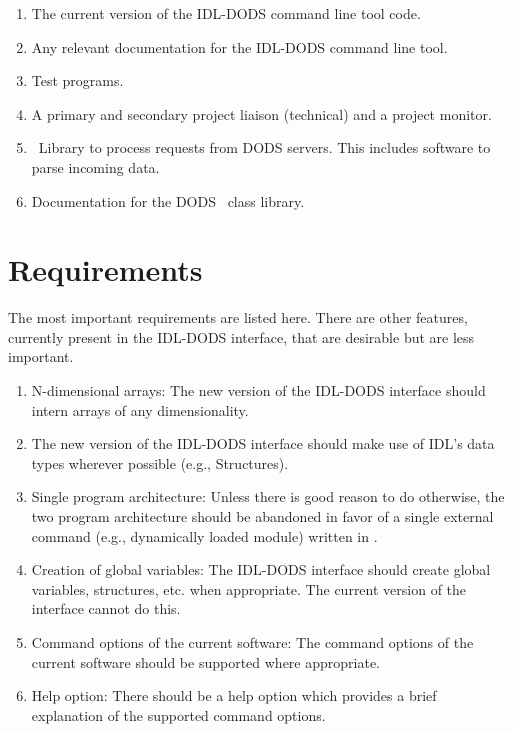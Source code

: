 \documentclass[12pt]{article}
\begin{document}
\begin{enumerate}
   \item The current version of the IDL-DODS command line tool code. 
   \item Any relevant documentation for the IDL-DODS command line tool.
   \item Test programs.
   \item A primary and secondary project liaison (technical) and a project
     monitor.
   \item \Cpp\ Library to process requests from DODS servers. This includes
     software to parse incoming data.
   \item Documentation for the DODS \Cpp\ class library.
\end{enumerate}

\section{Requirements}

The most important requirements are listed here. There are other features,
currently present in the IDL-DODS interface, that are desirable but are less
important. 

\begin{enumerate}

\item N-dimensional arrays: The new version of the IDL-DODS interface should
  intern arrays of any dimensionality.

\item The new version of the IDL-DODS interface should make use of IDL's
  data types wherever possible (e.g., Structures).

\item Single program architecture: Unless there is good reason to do
  otherwise, the two program architecture should be abandoned in favor of a
  single external command (e.g., dynamically loaded module) written in \Cpp.
  
\item Creation of global variables: The IDL-DODS interface should create
  global variables, structures, etc. when appropriate. The current version of
  the interface cannot do this.

\item Command options of the current software: The command options of the
  current software should be supported where appropriate.

\item Help option: There should be a help option which provides a brief
  explanation of the supported command options.

\end{enumerate}
\end{document}
